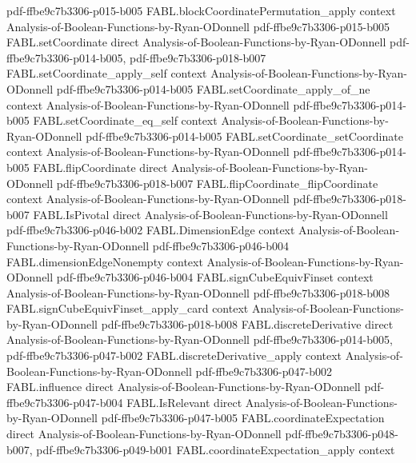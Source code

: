 \begin{theorem}
  {pdf-ffbe9c7b3306-p015-b005}
\proofstep
  {FABL.blockCoordinatePermutation_apply}
  {context}
  {Analysis-of-Boolean-Functions-by-Ryan-ODonnell}
  {pdf-ffbe9c7b3306-p015-b005}
\proofstep
  {FABL.setCoordinate}
  {direct}
  {Analysis-of-Boolean-Functions-by-Ryan-ODonnell}
  {pdf-ffbe9c7b3306-p014-b005,
    pdf-ffbe9c7b3306-p018-b007}
\proofstep
  {FABL.setCoordinate_apply_self}
  {context}
  {Analysis-of-Boolean-Functions-by-Ryan-ODonnell}
  {pdf-ffbe9c7b3306-p014-b005}
\proofstep
  {FABL.setCoordinate_apply_of_ne}
  {context}
  {Analysis-of-Boolean-Functions-by-Ryan-ODonnell}
  {pdf-ffbe9c7b3306-p014-b005}
\proofstep
  {FABL.setCoordinate_eq_self}
  {context}
  {Analysis-of-Boolean-Functions-by-Ryan-ODonnell}
  {pdf-ffbe9c7b3306-p014-b005}
\proofstep
  {FABL.setCoordinate_setCoordinate}
  {context}
  {Analysis-of-Boolean-Functions-by-Ryan-ODonnell}
  {pdf-ffbe9c7b3306-p014-b005}
\proofstep
  {FABL.flipCoordinate}
  {direct}
  {Analysis-of-Boolean-Functions-by-Ryan-ODonnell}
  {pdf-ffbe9c7b3306-p018-b007}
\proofstep
  {FABL.flipCoordinate_flipCoordinate}
  {context}
  {Analysis-of-Boolean-Functions-by-Ryan-ODonnell}
  {pdf-ffbe9c7b3306-p018-b007}
\proofstep
  {FABL.IsPivotal}
  {direct}
  {Analysis-of-Boolean-Functions-by-Ryan-ODonnell}
  {pdf-ffbe9c7b3306-p046-b002}
\proofstep
  {FABL.DimensionEdge}
  {context}
  {Analysis-of-Boolean-Functions-by-Ryan-ODonnell}
  {pdf-ffbe9c7b3306-p046-b004}
\proofstep
  {FABL.dimensionEdgeNonempty}
  {context}
  {Analysis-of-Boolean-Functions-by-Ryan-ODonnell}
  {pdf-ffbe9c7b3306-p046-b004}
\proofstep
  {FABL.signCubeEquivFinset}
  {context}
  {Analysis-of-Boolean-Functions-by-Ryan-ODonnell}
  {pdf-ffbe9c7b3306-p018-b008}
\proofstep
  {FABL.signCubeEquivFinset_apply_card}
  {context}
  {Analysis-of-Boolean-Functions-by-Ryan-ODonnell}
  {pdf-ffbe9c7b3306-p018-b008}
\proofstep
  {FABL.discreteDerivative}
  {direct}
  {Analysis-of-Boolean-Functions-by-Ryan-ODonnell}
  {pdf-ffbe9c7b3306-p014-b005,
    pdf-ffbe9c7b3306-p047-b002}
\proofstep
  {FABL.discreteDerivative_apply}
  {context}
  {Analysis-of-Boolean-Functions-by-Ryan-ODonnell}
  {pdf-ffbe9c7b3306-p047-b002}
\proofstep
  {FABL.influence}
  {direct}
  {Analysis-of-Boolean-Functions-by-Ryan-ODonnell}
  {pdf-ffbe9c7b3306-p047-b004}
\proofstep
  {FABL.IsRelevant}
  {direct}
  {Analysis-of-Boolean-Functions-by-Ryan-ODonnell}
  {pdf-ffbe9c7b3306-p047-b005}
\proofstep
  {FABL.coordinateExpectation}
  {direct}
  {Analysis-of-Boolean-Functions-by-Ryan-ODonnell}
  {pdf-ffbe9c7b3306-p048-b007,
    pdf-ffbe9c7b3306-p049-b001}
\proofstep
  {FABL.coordinateExpectation_apply}
  {context}

\end{theorem}
